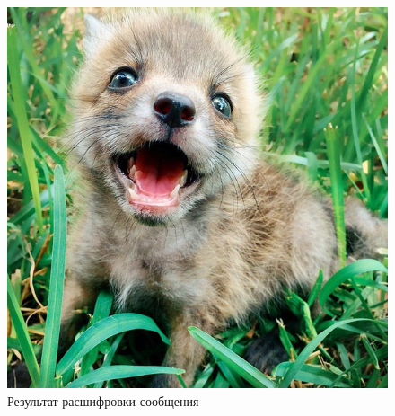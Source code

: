 \begin{figure}[H]
    \centering
    \includegraphics[width=18cm]{resources/12_decryption_result.jpg}
    \caption{Результат расшифровки сообщения}
    \label{fig:decryption-result}
\end{figure}